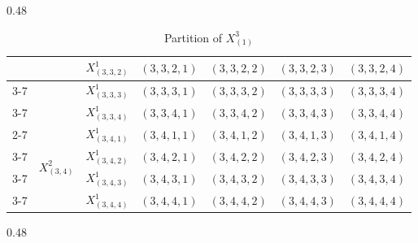 \documentclass[12pt]{article}
\begin{document}
\begin{table}[p]
\begin{subtable}[t]{0.48\textwidth}
{\begin{tabular}{|c|c|c|c|c|c|c|}
                                  &                                  & $X_{(3,3,2)}^{1}$ & \cellcolor{yellow!40} $(3,3,2,1)$ & \cellcolor{red!40}$(3,3,2,2)$ &\cellcolor{blue!40} $(3,3,2,3)$ & \cellcolor{green!40}$(3,3,2,4)$ \\ \cline{3-7}
                                  &                                  & $X_{(3,3,3)}^{1}$ & \cellcolor{red!40}$(3,3,3,1)$ & \cellcolor{blue!40}$(3,3,3,2)$ & \cellcolor{green!40}$(3,3,3,3)$ &\cellcolor{yellow!40} $(3,3,3,4)$ \\ \cline{3-7}
                                  &                                  & $X_{(3,3,4)}^{1}$ & \cellcolor{blue!40}$(3,3,4,1)$ & \cellcolor{green!40} $(3,3,4,2)$ & \cellcolor{yellow!40} $(3,3,4,3)$ & \cellcolor{red!40}$(3,3,4,4)$ \\ \cline{2-7}
                                  & \multirow{4}{*}{$X_{(3,4)}^{2}$} & $X_{(3,4,1)}^{1}$ & \cellcolor{yellow!40}$(3,4,1,1)$ &\cellcolor{red!40} $(3,4,1,2)$ &\cellcolor{blue!40} $(3,4,1,3)$ &\cellcolor{green!40} $(3,4,1,4)$ \\ \cline{3-7}
                                  &                                  & $X_{(3,4,2)}^{1}$ & \cellcolor{red!40}$(3,4,2,1)$ &\cellcolor{blue!40} $(3,4,2,2)$ &\cellcolor{green!40} $(3,4,2,3)$ &\cellcolor{yellow!40} $(3,4,2,4)$ \\ \cline{3-7}
                                  &                                  & $X_{(3,4,3)}^{1}$ & \cellcolor{blue!40} $(3,4,3,1)$ & \cellcolor{green!40} $(3,4,3,2)$ & \cellcolor{yellow!40} $(3,4,3,3)$ & \cellcolor{red!40}$(3,4,3,4)$ \\ \cline{3-7}
                                  &                                  & $X_{(3,4,4)}^{1}$ & \cellcolor{green!40}$(3,4,4,1)$ &\cellcolor{yellow!40} $(3,4,4,2)$ &\cellcolor{red!40} $(3,4,4,3)$ &\cellcolor{blue!40} $(3,4,4,4)$ \\ \hline
  \end{tabular}%
  }%
\end{subtable}%
\hfill
\begin{subtable}[t]{0.48\textwidth}
  \centering
  \caption{Partition of $X_{(1)}^{3}$}
  \renewcommand{\arraystretch}{1.5}
\end{subtable}
\end{table}
\end{document}
